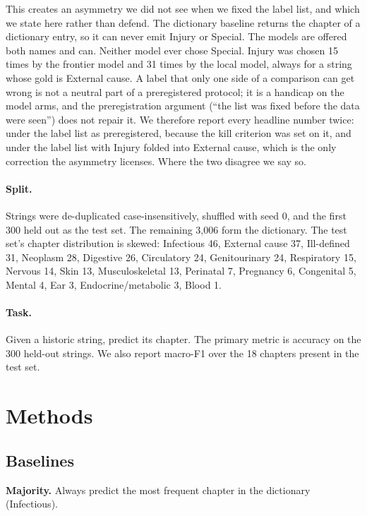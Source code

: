 \documentclass[11pt]{article}
\begin{document}
This creates an asymmetry we did not see when we fixed the label list, and which we state here rather than defend. The dictionary baseline returns the chapter of a dictionary entry, so it can never emit Injury or Special. The models are offered both names and can. Neither model ever chose Special. Injury was chosen 15 times by the frontier model and 31 times by the local model, always for a string whose gold is External cause. A label that only one side of a comparison can get wrong is not a neutral part of a preregistered protocol; it is a handicap on the model arms, and the preregistration argument (``the list was fixed before the data were seen'') does not repair it. We therefore report every headline number twice: under the label list as preregistered, because the kill criterion was set on it, and under the label list with Injury folded into External cause, which is the only correction the asymmetry licenses. Where the two disagree we say so.

\paragraph{Split.} Strings were de-duplicated case-insensitively, shuffled with seed 0, and the first 300 held out as the test set. The remaining 3,006 form the dictionary. The test set's chapter distribution is skewed: Infectious 46, External cause 37, Ill-defined 31, Neoplasm 28, Digestive 26, Circulatory 24, Genitourinary 24, Respiratory 15, Nervous 14, Skin 13, Musculoskeletal 13, Perinatal 7, Pregnancy 6, Congenital 5, Mental 4, Ear 3, Endocrine/metabolic 3, Blood 1.

\paragraph{Task.} Given a historic string, predict its chapter. The primary metric is accuracy on the 300 held-out strings. We also report macro-F1 over the 18 chapters present in the test set.

\section{Methods}
\label{sec:methods}

\subsection{Baselines}

\textbf{Majority.} Always predict the most frequent chapter in the dictionary (Infectious).
\end{document}
